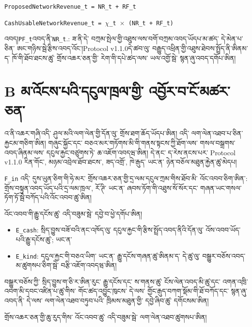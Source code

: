 \documentclass[11pt]{article}
\begin{document}
\texttt{ProposedNetworkRevenue\_t = NR\_t + RF\_t}

\texttt{CashUsableNetworkRevenue\_t = $\chi$\_t $\times$ (NR\_t + RF\_t)}

འབད།\texttt{PF\_t}འབད་ནི་\texttt{NR\_t}.: ཟ་ནི་དེ་ བཀྲམ་སྤེལ་གྱི་འཐུས་ལས་བགོ་བཀྲམ་འབད་ཡོདཔ་མ་ཚད་ དེ་མེན་པ་ཅིན་ ཨང་གཉིས་སྦེ་རྩིས་འབད་འོང་།Protocol v1.1.0དེ་ཚབ་ལུ་ བརྒྱུད་འཕྲིན་གྱི་འཐུས་ཐེབས་སྤྲོད་ནི་ཨིནམ་ད་ ཁོ་གི་ཐོབ་ཐངས་ཚུ་ གྲོས་འཆར་ཅན་གྱི་ རེག་གི་དཔེ་ཚད་ལས་ ཡལ་འགྱོ་སྦེ་ སྙན་ཞུ་འབད་དགོཔ་ཨིན།


\section*{B མ་འོངས་པའི་དངུལ་ཁྲལ་གྱི་ འབྱོར་བ་ངོ་མཚར་ཅན་}

འ་ནི་འཆར་གཞི་འདི་ ཤུལ་མའི་ལག་ལེན་གྱི་དོན་ལུ་ གྲོས་ཐག་ཆོད་ཡོདཔ་ཨིན། འདི་ ལག་ལེན་འཐབ་པ་ཅིན་རྐྱངམ་གཅིག་ཨིན། གཞུང་སྐྱོང་དང་ བཅའ་མར་གཏོགས་མི་གི་གནས་སྟངས་ཀྱི་ཐོག་ལས་ གསལ་བསྒྲགས་འབད་ཞིནམ་ལས་ དངུལ་རྐྱང་བཙུགས་ཏེ་ ཆ་འཇོག་འབདཝ་ཨིན། དེ་ནང་ ད་རེས་ནངས་པར་ Protocol v1.1.0 རིན་གོང་, མཉམ་འབྲེལ་ཐོབ་ཐངས་, ཟད་འགྲོ་, ཁེ་རྒུད་ ཡང་ན་ ཉེན་བཅོལ་མཐུན་རྐྱེན་ཚུ་མེདཔ།

\texttt{F\_in} འདི་ དུས་ཡུན་ཅིག་གི་ཧེ་མར་ གྲོས་འཆར་ཅན་གྱི་དྲ་ལམ་དངུལ་ཀྲམ་གིས་ཐོབ་མི་ འོང་འབབ་ཅིག་ཨིན་: གྲོས་བསྟུན་འབད་ཡོད་པའི་དྲ་ལམ་ཁྲལ་, རོ་ཊི་ ཡང་ན་ ཞབས་ཏོག་གི་འཐུས་སོ་སོར་དང་ གཞན་ཡང་གསལ་ཏོག་ཏོ་སྦེ་བཀོད་པའི་འོང་འབབ་ཚུ་ཨིན།

འོང་འབབ་གི་རྒྱུ་དངོས་ཚུ་ འདི་བཟུམ་སྦེ་ དབྱེ་བ་ཕྱེ་དགོཔ་ཨིན།

\begin{itemize}[leftmargin=*]
\item \texttt{E\_cash}: སྲིད་བྱུས་བཟོ་བའི་ནང་འཁོད་ལུ་ དངུལ་རྐྱང་གི་རྩིས་སྤྲོད་འབད་ནིའི་དོན་ལུ་ འོས་འབབ་ཡོད་པའི་རྒྱུ་དངོས་ཚུ་; ཡང་ན་
\item \texttt{E\_kind}: དངུལ་རྐྱང་གི་བཅའ་ཡིག་ ཡང་ན་ རྒྱུ་དངོས་གཞན་ཚུ་ཨིནམ་ད་ དེ་ཚུ་ལུ་ བསྒྱུར་བཅོས་འབད་མ་ཚུགསཔ་ཅིག་སྦེ་ བརྩི་འཇོག་འབདཝ་ཨིན།
\end{itemize}
བསྒྱུར་བཅོས་ཀྱི་ སྲིད་བྱུས་ག་ཅི་ར་ཨིན་རུང་ རྒྱུ་དངོས་དང་ ས་གནས་ཚུ་ ངོས་ལེན་འབད་མི་ཚུ་དང་ འགན་འཁྲི་འབག་མི་དབང་འཛིན་པ་ཚུ་གིས་ གོང་ཚད་འབྱུང་ཁུངས་ དེ་ལས་ གྱོང་རྒུད་བཀག་སྡོམ་གི་ཐོ་བཀོད་དང་ སྙན་ཞུ་འབད་ནི་ དེ་ལས་ ལག་ལེན་འཐབ་བཏུབ་པའི་ ཁྲིམས་མཐུན་གྱི་ དབྱེ་ཞིབ་ཚུ་ དགོངསམ་ཨིན།

གྲོས་འཆར་ཅན་གྱི་ཆུ་རུད་གིས་ འོང་འབབ་ཚུ་ འདི་བཟུམ་སྦེ་ ལག་ལེན་འཐབ་ཚུགསཔ་ཨིན།
\end{document}
